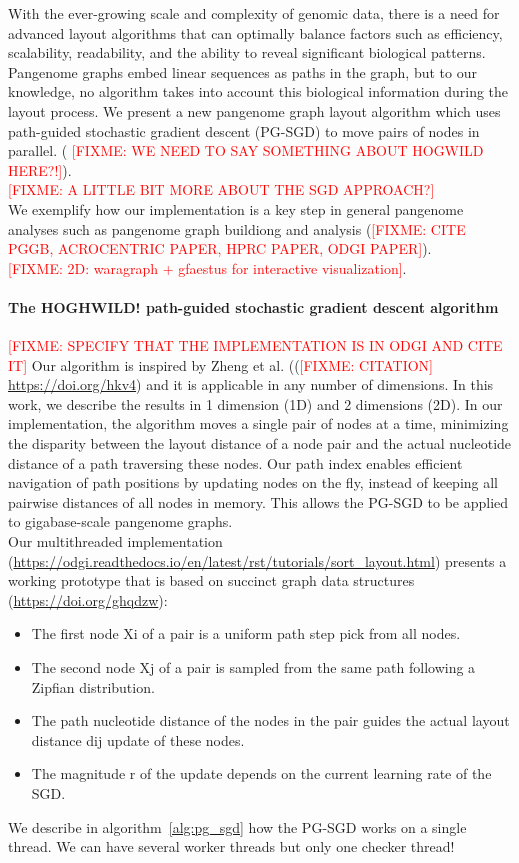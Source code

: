 \documentclass{bioinfo}
\theoremstyle{definition}
\newcommand{\red}[1]{{\textcolor{Red}{#1}}}
\newcommand{\FIXME}[1]{\red{[FIXME: #1]}}
\begin{document}
With the ever-growing scale and complexity of genomic data, there is a need for advanced layout algorithms that can optimally balance factors such as
efficiency, scalability, readability, and the ability to reveal significant biological patterns.
Pangenome graphs embed linear sequences as paths in the graph, but to our knowledge, no algorithm takes into account this biological information during the layout process.
We present a new pangenome graph layout algorithm which uses path-guided stochastic gradient descent %
 (PG-SGD) to move pairs of nodes in parallel. ( \FIXME{WE NEED TO SAY SOMETHING ABOUT HOGWILD HERE?!}). \\
\FIXME{A LITTLE BIT MORE ABOUT THE SGD APPROACH?} \\
We exemplify how our implementation is a key step in general pangenome analyses such as pangenome graph buildiong and analysis (\FIXME{CITE PGGB, ACROCENTRIC PAPER, HPRC PAPER, ODGI PAPER}). \\
\FIXME{2D: waragraph + gfaestus for interactive visualization}.

    \paragraph{The HOGHWILD! path-guided stochastic gradient descent algorithm}
    \FIXME{SPECIFY THAT THE IMPLEMENTATION IS IN ODGI AND CITE IT}
    Our algorithm is inspired by Zheng et al. ((\FIXME{CITATION} \url{https://doi.org/hkv4}) and it is applicable in any number of dimensions.
    In this work, we describe the results in 1 dimension (1D) and 2 dimensions (2D).
    In our implementation, the algorithm moves a single pair of nodes at a time, minimizing the disparity between the layout distance of a node pair and the actual nucleotide distance of a path traversing these nodes.
    Our path index enables efficient navigation of path positions by updating nodes on the fly, instead of keeping all pairwise distances of all nodes in memory.
    This allows the PG-SGD to be applied to gigabase-scale pangenome graphs. \\
    Our multithreaded implementation (\url{https://odgi.readthedocs.io/en/latest/rst/tutorials/sort_layout.html}) presents a working prototype that is based on succinct graph data structures (\url{https://doi.org/ghqdzw}):
    \begin{itemize}
        \item The first node Xi of a pair is a uniform path step pick from all nodes.
        \item The second node Xj of a pair is sampled from the same path following a Zipfian distribution.
        \item The path nucleotide distance of the nodes in the pair guides the actual layout distance dij update of these nodes.
        \item The magnitude r of the update depends on the current learning rate of the SGD.
    \end{itemize}
    We describe in algorithm~\ref{alg:pg_sgd} how the PG-SGD works on a single thread.
    We can have several worker threads but only one checker thread!
\end{document}
